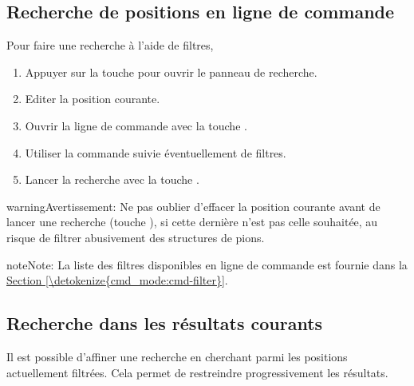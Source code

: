 \documentclass[letterpaper,10pt,french]{sphinxmanual}
\begin{document}
\subsection{Recherche de positions en ligne de commande}
\label{\detokenize{annexe_filtres:recherche-de-positions-en-ligne-de-commande}}
\sphinxAtStartPar
Pour faire une recherche à l’aide de filtres,
\begin{enumerate}
%
\item {} 
\sphinxAtStartPar
Appuyer sur la touche  pour ouvrir le panneau de recherche.

\item {} 
\sphinxAtStartPar
Editer la position courante.

\item {} 
\sphinxAtStartPar
Ouvrir la ligne de commande avec la touche .

\item {} 
\sphinxAtStartPar
Utiliser la commande  suivie éventuellement de filtres.

\item {} 
\sphinxAtStartPar
Lancer la recherche avec la touche .

\end{enumerate}

\begin{sphinxadmonition}{warning}{Avertissement:}
\sphinxAtStartPar
Ne pas oublier d’effacer la position courante avant de lancer une recherche
(touche ), si cette dernière n’est pas celle souhaitée, au
risque de filtrer abusivement des structures de pions.
\end{sphinxadmonition}

\begin{sphinxadmonition}{note}{Note:}
\sphinxAtStartPar
La liste des filtres disponibles en ligne de commande est fournie dans la
\hyperref[\detokenize{cmd_mode:cmd-filter}]{Section \ref{\detokenize{cmd_mode:cmd-filter}}}.
\end{sphinxadmonition}


\subsection{Recherche dans les résultats courants}
\label{\detokenize{annexe_filtres:recherche-dans-les-resultats-courants}}
\sphinxAtStartPar
Il est possible d’affiner une recherche en cherchant parmi les positions
actuellement filtrées. Cela permet de restreindre progressivement les résultats.
\end{document}
